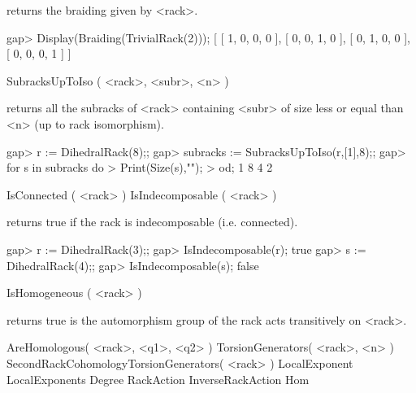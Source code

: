 returns the braiding given by <rack>.

\beginexample
gap> Display(Braiding(TrivialRack(2)));  
[ [  1,  0,  0,  0 ],
  [  0,  0,  1,  0 ],
  [  0,  1,  0,  0 ],
  [  0,  0,  0,  1 ] ]
\endexample

\>SubracksUpToIso ( <rack>, <subr>, <n> )

returns all the subracks of <rack> containing <subr> of 
size less or equal than <n> (up to rack isomorphism).

\beginexample
gap> r := DihedralRack(8);;
gap> subracks := SubracksUpToIso(r,[1],8);;
gap> for s in subracks do
> Print(Size(s),"\n");
> od;
1
8
4
2
\endexample

\>IsConnected ( <rack> )
\>IsIndecomposable ( <rack> )

returns true if the rack is indecomposable (i.e. connected).

\beginexample
gap> r := DihedralRack(3);;
gap> IsIndecomposable(r);
true
gap> s := DihedralRack(4);;
gap> IsIndecomposable(s);
false
\endexample

\>IsHomogeneous ( <rack> )

returns true is the automorphism group of the rack acts
transitively on <rack>.

\>AreHomologous( <rack>, <q1>, <q2> )
\>TorsionGenerators( <rack>, <n> )
\>SecondRackCohomologyTorsionGenerators( <rack> )
\>LocalExponent
\>LocalExponents
\>Degree
\>RackAction
\>InverseRackAction
\>Hom


